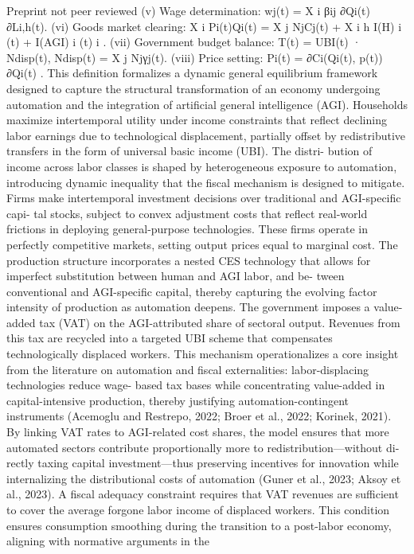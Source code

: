 Preprint not peer reviewed
(v) Wage determination:
wj(t) =
X
i
βij
∂Qi(t)
∂Li,h(t).
(vi) Goods market clearing:
X
i
Pi(t)Qi(t) =
X
j
NjCj(t) +
X
i
h
I(H)
i
(t) + I(AGI)
i
(t)
i
.
(vii) Government budget balance:
T(t) = UBI(t) · Ndisp(t),
Ndisp(t) =
X
j
Njγj(t).
(viii) Price setting:
Pi(t) = ∂Ci(Qi(t), p(t))
∂Qi(t)
.
This definition formalizes a dynamic general equilibrium framework designed to capture
the structural transformation of an economy undergoing automation and the integration of
artificial general intelligence (AGI). Households maximize intertemporal utility under income
constraints that reflect declining labor earnings due to technological displacement, partially
offset by redistributive transfers in the form of universal basic income (UBI). The distri-
bution of income across labor classes is shaped by heterogeneous exposure to automation,
introducing dynamic inequality that the fiscal mechanism is designed to mitigate.
Firms make intertemporal investment decisions over traditional and AGI-specific capi-
tal stocks, subject to convex adjustment costs that reflect real-world frictions in deploying
general-purpose technologies. These firms operate in perfectly competitive markets, setting
output prices equal to marginal cost. The production structure incorporates a nested CES
technology that allows for imperfect substitution between human and AGI labor, and be-
tween conventional and AGI-specific capital, thereby capturing the evolving factor intensity
of production as automation deepens.
The government imposes a value-added tax (VAT) on the AGI-attributed share of sectoral
output. Revenues from this tax are recycled into a targeted UBI scheme that compensates
technologically displaced workers. This mechanism operationalizes a core insight from the
literature on automation and fiscal externalities: labor-displacing technologies reduce wage-
based tax bases while concentrating value-added in capital-intensive production, thereby
justifying automation-contingent instruments (Acemoglu and Restrepo, 2022; Broer et al.,
2022; Korinek, 2021). By linking VAT rates to AGI-related cost shares, the model ensures
that more automated sectors contribute proportionally more to redistribution—without di-
rectly taxing capital investment—thus preserving incentives for innovation while internalizing
the distributional costs of automation (Guner et al., 2023; Aksoy et al., 2023).
A fiscal adequacy constraint requires that VAT revenues are sufficient to cover the average
forgone labor income of displaced workers. This condition ensures consumption smoothing
during the transition to a post-labor economy, aligning with normative arguments in the
